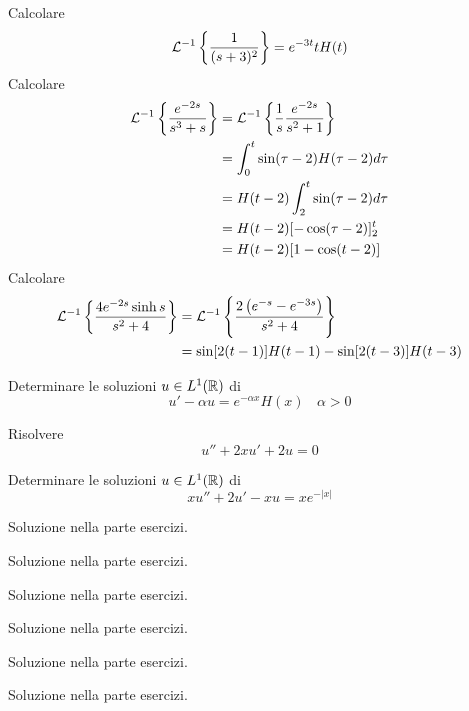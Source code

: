 Calcolare
\begin{equation*}
\mathcal{L}^{- 1}\left\{\frac{1}{(s + 3)^{2}}\right\} = e^{- 3t} tH(t)
\end{equation*}
Calcolare
\begin{equation*}
\begin{aligned}
\mathcal{L}^{- 1}\left\{\frac{e^{- 2s}}{s^{3} + s}\right\} & = \mathcal{L}^{- 1}\left\{\frac{1}{s}\frac{e^{- 2s}}{s^{2} + 1}\right\}\\
 & = \int^{t}_{0}\sin(\tau - 2) H(\tau - 2) d\tau \\
 & = H(t - 2)\int^{t}_{2}\sin(\tau - 2) d\tau \\
 & = H(t - 2)[ - \cos(\tau - 2)]^{t}_{2}\\
 & = H(t - 2)[ 1 - \cos(t - 2)]
\end{aligned}
\end{equation*}
Calcolare
\begin{equation*}
\begin{aligned}
\mathcal{L}^{- 1}\left\{\frac{4e^{- 2s}\sinh s}{s^{2} + 4}\right\} & = \mathcal{L}^{- 1}\left\{\frac{2\left(e^{- s} - e^{- 3s}\right)}{s^{2} + 4}\right\}\\
 & = \sin[ 2(t - 1)] H(t - 1) - \sin[ 2(t - 3)] H(t - 3)
\end{aligned}
\end{equation*}
\Esercizio{}

Determinare le soluzioni $u\in L^{1}(\mathbb{R})$ di
\begin{equation*}
u' - \alpha u = e^{- \alpha x} H(x) \ \ \ \ \alpha > 0
\end{equation*}
\Esercizio{}

Risolvere
\begin{equation*}
u'' + 2xu' + 2u = 0
\end{equation*}
\Esercizio{}

Determinare le soluzioni $u\in L^{1}(\mathbb{R})$ di
\begin{equation*}
xu'' + 2u' - xu = xe^{- | x|}
\end{equation*}
\ParteSoluzioni
\Soluzione

Soluzione nella parte esercizi.
\Soluzione

Soluzione nella parte esercizi.
\Soluzione

Soluzione nella parte esercizi.
\Soluzione

Soluzione nella parte esercizi.
\Soluzione

Soluzione nella parte esercizi.
\Soluzione

Soluzione nella parte esercizi.
\Soluzione

